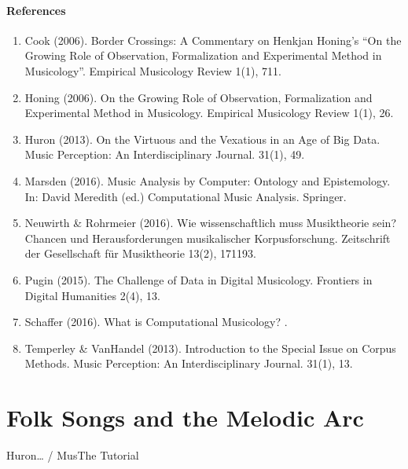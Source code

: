 \documentclass[letterpaper,10pt,english]{sphinxmanual}
\begin{document}
\subsubsection*{References}
\begin{enumerate}
%
\item {} 
Cook (2006). Border Crossings: A Commentary on Henkjan Honing’s “On the Growing Role of Observation, Formalization and Experimental Method in Musicology”. Empirical Musicology Review 1(1), 7\sphinxhyphen{}11.

\item {} 
Honing (2006). On the Growing Role of Observation, Formalization and Experimental Method in Musicology. Empirical Musicology Review 1(1), 2\sphinxhyphen{}6.

\item {} 
Huron (2013). On the Virtuous and the Vexatious in an Age of Big Data. Music Perception: An Interdisciplinary Journal. 31(1), 4\sphinxhyphen{}9.

\item {} 
Marsden (2016). Music Analysis by Computer: Ontology and Epistemology. In: David Meredith (ed.) Computational Music Analysis. Springer.

\item {} 
Neuwirth \& Rohrmeier (2016). Wie wissenschaftlich muss Musiktheorie sein? Chancen und Herausforderungen musikalischer Korpusforschung. Zeitschrift der Gesellschaft für Musiktheorie 13(2), 171\sphinxhyphen{}193.

\item {} 
Pugin (2015). The Challenge of Data in Digital Musicology. Frontiers in Digital Humanities 2(4), 1\sphinxhyphen{}3.

\item {} 
Schaffer (2016). What is Computational Musicology? .

\item {} 
Temperley \& VanHandel (2013). Introduction to the Special Issue on Corpus Methods. Music Perception: An Interdisciplinary Journal. 31(1), 1\sphinxhyphen{}3.

\end{enumerate}


\chapter{Folk Songs and the Melodic Arc}
\label{\detokenize{folk_songs:folk-songs-and-the-melodic-arc}}\label{\detokenize{folk_songs::doc}}
Huron… / MusThe Tutorial
\end{document}
